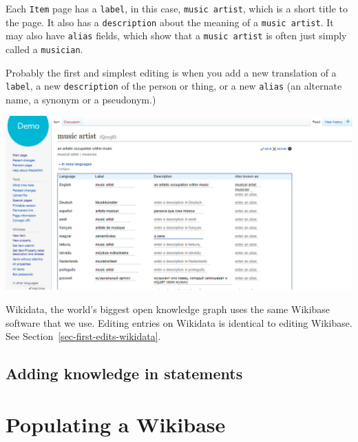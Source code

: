 \documentclass[
  letterpaper,
  DIV=11,
  numbers=noendperiod]{scrreprt}
\begin{document}
Each \texttt{Item} page has a \texttt{label}, in this case,
\texttt{music\ artist}, which is a short title to the page. It also has
a \texttt{description} about the meaning of a \texttt{music\ artist}. It
may also have \texttt{alias} fields, which show that a
\texttt{music\ artist} is often just simply called a \texttt{musician}.

Probably the first and simplest editing is when you add a new
translation of a \texttt{label}, a new \texttt{description} of the
person or thing, or a new \texttt{alias} (an alternate name, a synonym
or a pseudonym.)

\includegraphics{png/wikibase/edit/add_new_translation_2x1.png}

\begin{tcolorbox}[enhanced jigsaw, opacityback=0, bottomrule=.15mm, rightrule=.15mm, toptitle=1mm, breakable, colbacktitle=quarto-callout-tip-color!10!white, colback=white, title=\textcolor{quarto-callout-tip-color}{\faLightbulb}\hspace{0.5em}{Tip}, leftrule=.75mm, toprule=.15mm, left=2mm, arc=.35mm, colframe=quarto-callout-tip-color-frame, coltitle=black, titlerule=0mm, bottomtitle=1mm, opacitybacktitle=0.6]

Wikidata, the world's biggest open knowledge graph uses the same
Wikibase software that we use. Editing entries on Wikidata is identical
to editing Wikibase. See Section~\ref{sec-first-edits-wikidata}.

\end{tcolorbox}

\subsection{Adding knowledge in
statements}\label{adding-knowledge-in-statements}

\section{Populating a Wikibase}\label{populating-a-wikibase}
\end{document}
